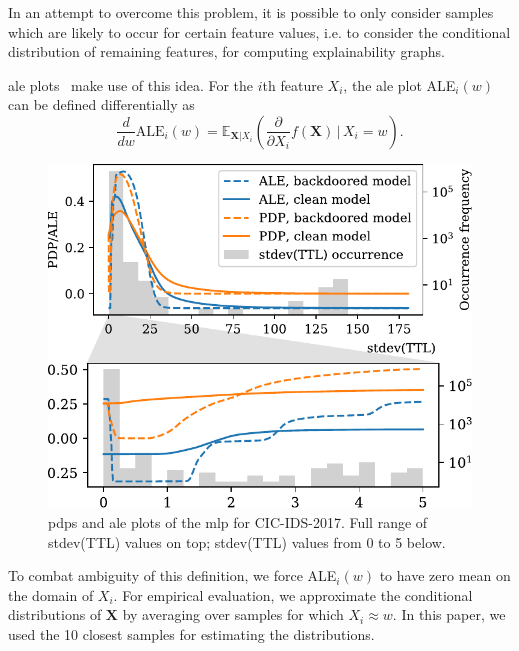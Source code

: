 \documentclass[10pt,sigconf,letterpaper,dvipsnames]{acmart}
\newcommand\note[2]{{\color{#1}#2}}
\newcommand\todo[1]{{\note{red}{TODO: #1}}}
\newcommand{\cic}{CIC-IDS-2017}
\begin{document}
In an attempt to overcome this problem, it is possible to only consider samples which are likely to occur for certain feature values, i.e. to consider the conditional distribution of remaining features, for computing explainability graphs.

\gls{ale} plots~\cite{apley_visualizing_2016} make use of this idea.
For the $i$th feature $X_i$, the \gls{ale} plot ALE$_i(w)$ can be defined differentially as
\begin{equation}
\frac{d}{dw} \text{ALE}_i (w) = \mathbb E_{\boldsymbol X | X_i}\left(\frac{\partial}{\partial X_i} f(\boldsymbol X) \, \Big \vert \, X_i=w\right) .
\end{equation}


\begin{figure}[b!]
\includegraphics[width=\columnwidth]{figures/pdpale2017nn_joint_2.pdf}

\caption{\glspl{pdp} and \gls{ale} plots of the \gls{mlp} for \cic{}. Full range of stdev(TTL) values on top; stdev(TTL) values from 0 to 5 below.}
\label{fig:pdp_ttl}
\end{figure}


To combat ambiguity of this definition, we force ALE$_i(w)$ to have zero mean on the domain of $X_i$.
For empirical evaluation, we approximate the conditional distributions of $\boldsymbol X$ by averaging over samples for which $X_i \approx w$. In this paper, we used the 10  closest samples
for estimating the distributions.
\end{document}
